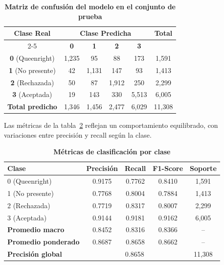 \documentclass[12pt]{report}
\begin{document}
\begin{table}[htbp]
\centering
\caption{\textbf{Matriz de confusión del modelo en el conjunto de prueba}}
\label{tab:confusion_matrix}
\begin{tabular}{|c|c|c|c|c|c|}
\hline
\multirow{2}{*}{\textbf{Clase Real}} & \multicolumn{4}{c|}{\textbf{Clase Predicha}} & \multirow{2}{*}{\textbf{Total}} \\
\cline{2-5}
 & \textbf{0} & \textbf{1} & \textbf{2} & \textbf{3} & \\
\hline
\textbf{0} (Queenright) & 1,235 & 95 & 88 & 173 & 1,591 \\
\textbf{1} (No presente) & 42 & 1,131 & 147 & 93 & 1,413 \\
\textbf{2} (Rechazada) & 50 & 87 & 1,912 & 250 & 2,299 \\
\textbf{3} (Aceptada) & 19 & 143 & 330 & 5,513 & 6,005 \\
\hline
\textbf{Total predicho} & 1,346 & 1,456 & 2,477 & 6,029 & 11,308 \\
\hline
\end{tabular}
\end{table}

\par Las métricas de la tabla~\ref{tab:classification_metrics} reflejan un comportamiento equilibrado, con variaciones entre precisión y recall según la clase.

\begin{table}[htbp]
\centering
\caption{\textbf{Métricas de clasificación por clase}}
\label{tab:classification_metrics}
\begin{tabular}{|l|c|c|c|c|}
\hline
\textbf{Clase} & \textbf{Precisión} & \textbf{Recall} & \textbf{F1-Score} & \textbf{Soporte} \\
\hline
0 (Queenright) & 0.9175 & 0.7762 & 0.8410 & 1,591 \\
1 (No presente) & 0.7768 & 0.8004 & 0.7884 & 1,413 \\
2 (Rechazada) & 0.7719 & 0.8317 & 0.8007 & 2,299 \\
3 (Aceptada) & 0.9144 & 0.9181 & 0.9162 & 6,005 \\
\hline
\textbf{Promedio macro} & 0.8452 & 0.8316 & 0.8366 & -- \\
\textbf{Promedio ponderado} & 0.8687 & 0.8658 & 0.8662 & -- \\
\hline
\textbf{Precisión global} & \multicolumn{3}{c|}{0.8658} & 11,308 \\
\hline
\end{tabular}
\end{table}
\end{document}

